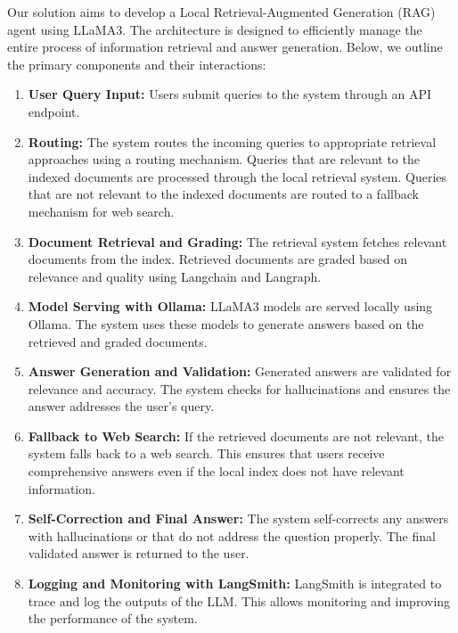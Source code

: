 Our solution aims to develop a Local Retrieval-Augmented Generation (RAG) agent using LLaMA3. The architecture is designed to efficiently manage the entire process of information retrieval and answer generation. Below, we outline the primary components and their interactions:

\begin{enumerate}
    \item \textbf{User Query Input:} Users submit queries to the system through an API endpoint.

    \item \textbf{Routing:} The system routes the incoming queries to appropriate retrieval approaches using a routing mechanism. Queries that are relevant to the indexed documents are processed through the local retrieval system. Queries that are not relevant to the indexed documents are routed to a fallback mechanism for web search.

    \item \textbf{Document Retrieval and Grading:} The retrieval system fetches relevant documents from the index. Retrieved documents are graded based on relevance and quality using Langchain and Langraph.

    \item \textbf{Model Serving with Ollama:} LLaMA3 models are served locally using Ollama. The system uses these models to generate answers based on the retrieved and graded documents.

    \item \textbf{Answer Generation and Validation:} Generated answers are validated for relevance and accuracy. The system checks for hallucinations and ensures the answer addresses the user's query.

    \item \textbf{Fallback to Web Search:} If the retrieved documents are not relevant, the system falls back to a web search. This ensures that users receive comprehensive answers even if the local index does not have relevant information.

    \item \textbf{Self-Correction and Final Answer:} The system self-corrects any answers with hallucinations or that do not address the question properly. The final validated answer is returned to the user.

    \item \textbf{Logging and Monitoring with LangSmith:} LangSmith is integrated to trace and log the outputs of the LLM. This allows monitoring and improving the performance of the system.

\end{enumerate}


